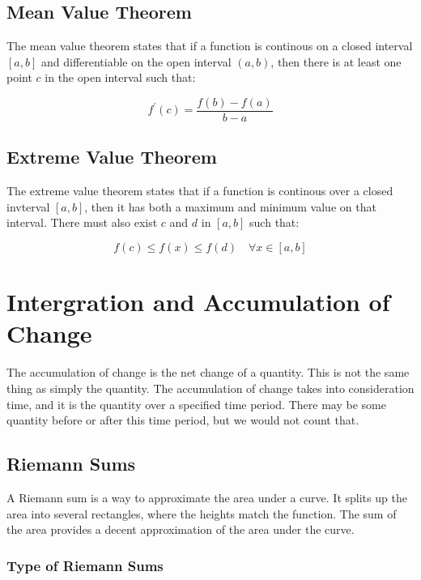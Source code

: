 \documentclass[12pt]{article}
\begin{document}
        \subsection{Mean Value Theorem}

        The mean value theorem states that if a function is continous on a closed interval $[a, b]$ and differentiable on the 
        open interval $(a, b)$, then there is at least one point $c$ in the open interval such that: 

        \[
            f^{\prime}(c) = \frac{f(b) - f(a)}{b - a}    
        \]

        \subsection{Extreme Value Theorem}

        The extreme value theorem states that if a function is continous over a closed invterval $[a, b]$, then it has both a 
        maximum and minimum value on that interval. There must also exist $c$ and $d$ in $[a, b]$ such that:

        \[
            f(c) \le f(x) \le f(d) \quad \forall x \in [a, b]    
        \]

        \section{Intergration and Accumulation of Change}

        The accumulation of change is the net change of a quantity. This is not the same
        thing as simply the quantity. The accumulation of change takes into consideration time, 
        and it is the quantity over a specified time period. There may be some quantity before or 
        after this time period, but we would not count that. 

        \subsection{Riemann Sums}

        A Riemann sum is a way to approximate the area under a curve. It splits up the area into several
        rectangles, where the heights match the function. The sum of the area provides a decent
        approximation of the area under the curve.

        \subsubsection{Type of Riemann Sums}
\end{document}
